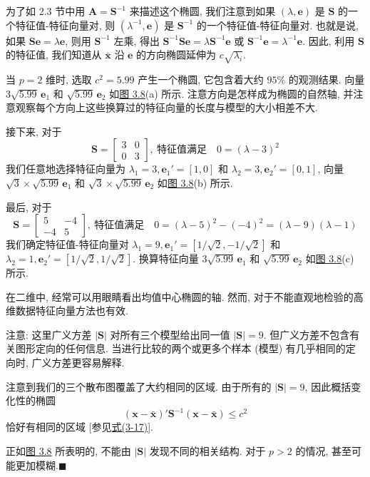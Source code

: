 为了如 2.3 节中用 $\mathbf{A}=\mathbf{S}^{-1}$ 来描述这个椭圆, 我们注意到如果 $(\lambda,\mathbf{e})$ 是 $\mathbf{S}$ 的一个特征值-特征向量对, 则 $(\lambda^{-1},\mathbf{e})$ 是 $\mathbf{S}^{-1}$ 的一个特征值-特征向量对. 也就是说, 如果 $\mathbf{S}\mathbf{e}=\lambda\mathbf{e}$, 则用 $\mathbf{S}^{-1}$ 左乘, 得出 $\mathbf{S}^{-1}\mathbf{S}\mathbf{e}=\lambda\mathbf{S}^{-1}\mathbf{e}$ 或 $\mathbf{S}^{-1}\mathbf{e}=\lambda^{-1}\mathbf{e}$. 因此, 利用 $\mathbf{S}$ 的特征值, 我们知道从 $\bar{\mathbf{x}}$ 沿 $\mathbf{e}$ 的方向椭圆延伸为 $c\sqrt{\lambda_{i}}$.

当 $p=2$ 维时, 选取 $c^{2}=5.99$ 产生一个椭圆, 它包含着大约 $95\%$ 的观测结果. 向量 $3\sqrt{5.99}\,\mathbf{e}_{1}$ 和 $\sqrt{5.99}\,\mathbf{e}_{2}$ 如\hyperref[fig:3.8]{图 3.8}(a) 所示. 注意方向是怎样成为椭圆的自然轴, 并注意观察每个方向上这些换算过的特征向量的长度与模型的大小相差不大.

\begin{mvfigure}
\label{fig:3.8}
\end{mvfigure}

接下来, 对于
\[
\mathbf{S}=\begin{bmatrix}3&0\\0&3\end{bmatrix},\ \text{特征值满足}\quad 0=(\lambda-3)^{2}
\]
我们任意地选择特征向量为 $\lambda_{1}=3,\mathbf{e}_{1}'=[1,0]$ 和 $\lambda_{2}=3,\mathbf{e}_{2}'=[0,1]$, 向量 $\sqrt{3}\times\sqrt{5.99}\,\mathbf{e}_{1}$ 和 $\sqrt{3}\times\sqrt{5.99}\,\mathbf{e}_{2}$ 如\hyperref[fig:3.8]{图 3.8}(b) 所示.

最后, 对于
\[
\mathbf{S}=\begin{bmatrix}5&-4\\-4&5\end{bmatrix},\ \text{特征值满足}\quad 0=(\lambda-5)^{2}-(-4)^{2}=(\lambda-9)(\lambda-1)
\]
我们确定特征值-特征向量对 $\lambda_{1}=9,\mathbf{e}_{1}'=[1/\sqrt{2},-1/\sqrt{2}]$ 和 $\lambda_{2}=1,\mathbf{e}_{2}'=[1/\sqrt{2},1/\sqrt{2}]$. 换算特征向量 $3\sqrt{5.99}\,\mathbf{e}_{1}$ 和 $\sqrt{5.99}\,\mathbf{e}_{2}$ 如\hyperref[fig:3.8]{图 3.8}(c) 所示.

在二维中, 经常可以用眼睛看出均值中心椭圆的轴. 然而, 对于不能直观地检验的高维数据特征向量方法也有效.

注意: 这里广义方差 $|\mathbf{S}|$ 对所有三个模型给出同一值 $|\mathbf{S}|=9$. 但广义方差不包含有关图形定向的任何信息. 当进行比较的两个或更多个样本 (模型) 有几乎相同的定向时, 广义方差更容易解释.

注意到我们的三个散布图覆盖了大约相同的区域. 由于所有的 $|\mathbf{S}|=9$, 因此概括变化性的椭圆
\[
(\mathbf{x}-\bar{\mathbf{x}})'\mathbf{S}^{-1}(\mathbf{x}-\bar{\mathbf{x}})\le c^{2}
\]
恰好有相同的区域 [参见\hyperref[eq:3-17]{式(3-17)}].

正如\hyperref[fig:3.8]{图 3.8} 所表明的, 不能由 $|\mathbf{S}|$ 发现不同的相关结构. 对于 $p>2$ 的情况, 甚至可能更加模糊.\hfill$\blacksquare$
